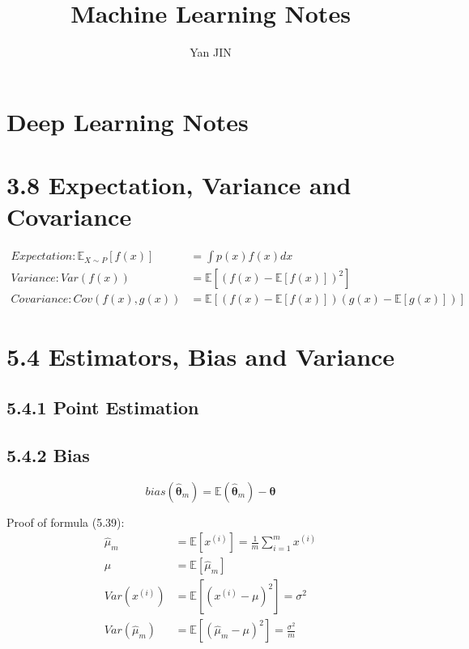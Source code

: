 \documentclass[12pt]{article}
\numberwithin{equation}{section}
\begin{document}
\small
  \renewcommand\figurename{Fig.}
    \title{Machine Learning Notes}
    \author{Yan JIN}
    \pagestyle{fancy}\fancyhf{}
    \lhead{}
    \lfoot{\textit{}}\cfoot{}\rfoot{\thepage}
    \renewcommand{\headrulewidth}{1.pt}
    \renewcommand{\footrulewidth}{1.pt}
  \maketitle

\section{Deep Learning\cite{Goodfellow-et-al-2016-Book} Notes}
\section{3.8 Expectation, Variance and Covariance}
\begin{align*}
Expectation: \mathbb{E}_{X \sim P}[f(x)]&=\int p(x)f(x)dx \\
Variance: Var(f(x))&=\mathbb{E}[(f(x)-\mathbb{E}[f(x)])^2] \\
Covariance: Cov(f(x),g(x))&=\mathbb{E}[(f(x)-\mathbb{E}[f(x)])(g(x)-\mathbb{E}[g(x)])]
\end{align*}
\section{5.4 Estimators, Bias and Variance}
\subsection{5.4.1 Point Estimation}
\subsection{5.4.2 Bias}
\[ bias(\hat{{\boldsymbol\theta}}_m)=\mathbb{E}(\hat{\boldsymbol\theta}_m)-\boldsymbol\theta
\]

Proof of formula (5.39):
\begin{align*}
\hat{\mu}_m&=\mathbb{E}[x^{(i)}]=\frac{1}{m}\sum_{i=1}^{m}x^{(i)} \\
\mu&=\mathbb{E}[\hat{\mu}_m] \\
Var(x^{(i)})&=\mathbb{E}[(x^{(i)}-\mu)^2]=\sigma^2 \\
Var(\hat{\mu}_m)&=\mathbb{E}[(\hat{\mu}_m-\mu)^2] =\frac{\sigma^2}{m}
\end{align*}
\end{document}
